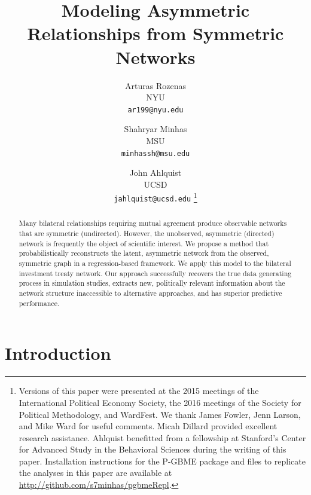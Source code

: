 \documentclass[a4paper, 12pt]{article}
\begin{document}
\title{{\bf Modeling Asymmetric Relationships from Symmetric Networks}}

\author{
  Arturas Rozenas\\
{\small NYU}\\
  {\small \texttt{ar199@nyu.edu}}
\and
  Shahryar Minhas\\
{\small MSU}\\
  {\small \texttt{minhassh@msu.edu}}
  \and
  John Ahlquist\\
{\small UCSD}\\
  {\small \texttt{jahlquist@ucsd.edu}}
\thanks{Versions of this paper were presented at the 2015 meetings of the International Political Economy Society, the 2016 meetings of the Society for Political Methodology, and WardFest.  We thank James Fowler, Jenn Larson, and Mike Ward for useful comments. Micah Dillard provided excellent research assistance.  Ahlquist benefitted from a fellowship at Stanford's Center for Advanced Study in the Behavioral Sciences during the writing of this paper.  Installation instructions for the P-GBME package and files to replicate the analyses in this paper are available at \url{http://github.com/s7minhas/pgbmeRepl}.}}

\maketitle 
\thispagestyle{empty}

\bigskip

\begin{abstract}
 \noindent Many bilateral relationships requiring mutual agreement produce observable networks that are symmetric (undirected). However, the unobserved, asymmetric (directed) network is frequently the object of scientific interest. We propose a method that probabilistically reconstructs the latent, asymmetric network from the observed, symmetric graph in a regression-based framework. We apply this model to the bilateral investment treaty network. Our approach successfully recovers the true data generating process in simulation studies, extracts new, politically relevant information about the network structure inaccessible to alternative approaches, and has superior predictive performance. 
\end{abstract}

\clearpage

\singlespacing

\section{Introduction} %
\end{document}

